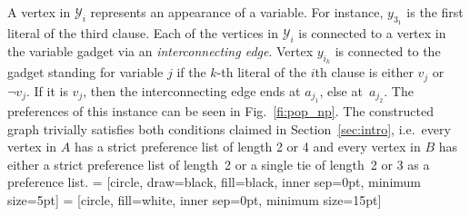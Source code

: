 \documentclass[11pt]{llncs}
\begin{document}
A vertex in $\mathcal{Y}_i$ represents an appearance of a variable. For instance, $y_{3_1}$ is the first literal of the third clause. Each of 
the vertices in $\mathcal{Y}_i$ is connected to a vertex in the variable gadget via an \emph{interconnecting edge}. Vertex $y_{i_k}$ is 
connected to the gadget standing for variable $j$ if the $k$-th literal of the $i$th clause is either $v_j$ or~$\neg v_j$. If it is $v_j$,
then the interconnecting edge ends at $a_{j_1}$, else at~$a_{j_2}$. The preferences of this instance can be seen in 
Fig.~\ref{fi:pop_np}. The constructed graph trivially satisfies both conditions claimed in Section~\ref{sec:intro}, i.e.\ 
every vertex in $A$ has a strict preference list of length 2 or 4 and every vertex in $B$ has either a strict preference list of length~2 
or a single tie of length~2 or 3 as a preference list.
 = [circle, draw=black, fill=black, inner sep=0pt,  minimum size=5pt]
\tikzstyle{edgelabel} = [circle, fill=white, inner sep=0pt,  minimum size=15pt]
\end{document}
